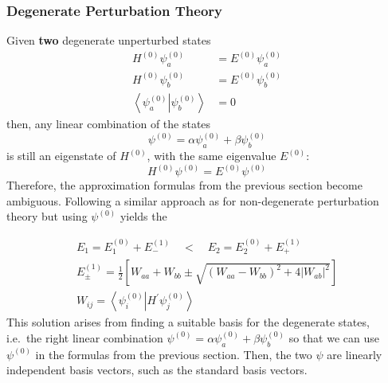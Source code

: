\subsubsection{Degenerate Perturbation Theory}
Given \textbf{two} degenerate unperturbed states
\begin{align*}
    H^{(0)}\psi_a^{(0)}                                            & =E^{(0)}\psi_a^{(0)} \\
    H^{(0)}\psi_b^{(0)}                                            & =E^{(0)}\psi_b^{(0)} \\
    \left\langle\psi_a^{(0)}\right|\left.\psi_b^{(0)}\right\rangle & =0
\end{align*}
then, any linear combination of the states
\begin{equation*}
    \psi^{(0)}=\alpha\psi_a^{(0)}+\beta\psi_b^{(0)}
\end{equation*}
is still an eigenstate of $H^{(0)}$, with the same eigenvalue $E^{(0)}$:
\begin{equation*}
    H^{(0)}\psi^{(0)}=E^{(0)}\psi^{(0)}
\end{equation*}
Therefore, the approximation formulas from the previous section become ambiguous. Following a similar approach as for non-degenerate perturbation theory but using $\psi^{(0)}$ yields the

\newpar{}
\begin{gather*}
    E_1 = E_1^{(0)} + E_{-}^{(1)} \quad < \quad E_2 = E_2^{(0)} + E_{+}^{(1)}\\
    E_{\pm}^{(1)}=\frac{1}{2}\left[W_{aa}+W_{bb}\pm\sqrt{{(W_{aa}-W_{bb})}^{2}+4 |W_{ab}|^{2}}\right]\\
    W_{ij}=\left\langle\psi_{i}^{(0)} \right| H^{\prime} \left.\psi_{j}^{(0)}\right\rangle
\end{gather*}
This solution arises from finding a suitable basis for the degenerate states, i.e.\ the right linear combination $\psi^{(0)}=\alpha\psi_a^{(0)}+\beta\psi_b^{(0)}$ so that we can use $\psi^{(0)}$ in the formulas from the previous section. Then, the two $\psi$ are linearly independent basis vectors, such as the standard basis vectors.

